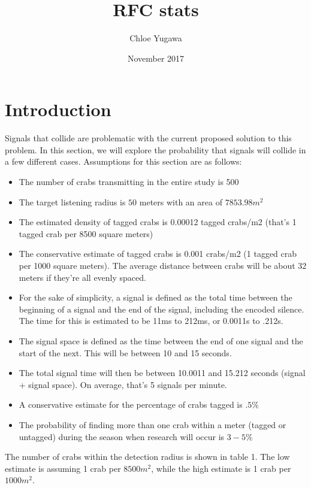\documentclass{article}
\title{RFC stats}
\author{Chloe Yugawa}
\date{November 2017}
\begin{document}
\maketitle

\section{Introduction}
Signals that collide are problematic with the current proposed solution to this problem. In this section, we will explore the probability that signals will collide in a few different cases. Assumptions for this section are as follows:
\begin{itemize}
\item The number of crabs transmitting in the entire study is 500
\item The target listening radius is $50$ meters with an area of $7853.98m^2$
\item The estimated density of tagged crabs is 0.00012 tagged crabs/m2 (that's 1 tagged crab per 8500 square meters)
\item The conservative estimate of tagged crabs is 0.001 crabs/m2 (1 tagged crab per 1000 square meters).  The average distance between crabs will be about 32 meters if they're all evenly spaced.
\item For the sake of simplicity, a signal is defined as the total time between the beginning of a signal and the end of the signal, including the encoded silence. The time for this is estimated to be 11ms to 212ms, or 0.0011s to .212s.
\item The signal space is defined as the time between the end of one signal and the start of the next. This will be between 10 and 15 seconds.
\item The total signal time will then be between 10.0011 and 15.212 seconds (signal + signal space). On average, that's 5 signals per minute.
\item A conservative estimate for the percentage of crabs tagged is $.5\% $
\item The probability of finding more than one crab within a meter (tagged or untagged) during the season when research will occur is $3-5\%$

\end{itemize}



The number of crabs within the detection radius is shown in table 1. The low estimate is assuming 1 crab per $8500m^2$, while the high estimate is 1 crab per $1000m^2$.
\end{document}
